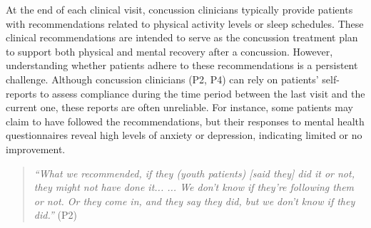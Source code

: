 At the end of each clinical visit, concussion clinicians typically provide patients with recommendations related to physical activity levels or sleep schedules.
These clinical recommendations are intended to serve as the concussion treatment plan to support both physical and mental recovery after a concussion.
However, understanding whether patients adhere to these recommendations is a persistent challenge.
Although concussion clinicians (P2, P4) can rely on patients’ self-reports to assess compliance during the time period between the last visit and the current one, these reports are often unreliable. 
For instance, some patients may claim to have followed the recommendations, but their responses to mental health questionnaires reveal high levels of anxiety or depression, indicating limited or no improvement.


 

\begin{quote}
    \textit{“What we recommended, if they (youth patients) [said they] did it or not, they might not have done it... ... We don't know if they're following them or not. Or they come in, and they say they did, but we don't know if they did.”} (P2)
\end{quote}

